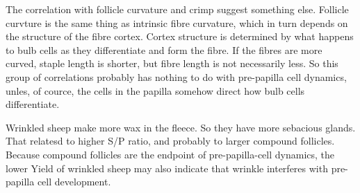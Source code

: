 \documentclass[titlepage]{article}  %
\begin{document}
The correlation with follicle curvature and crimp suggest something else. Follicle curvture is the same thing as intrinsic fibre curvature, which in turn depends on the structure of the fibre cortex. Cortex structure is determined by what happens to bulb cells as they differentiate and form the fibre. If the fibres are more curved, staple length is shorter, but fibre length is not necessarily less. So this group of correlations probably has nothing to do with pre-papilla cell dynamics, unles, of cource, the cells in the papilla somehow direct how bulb cells differentiate.

Wrinkled sheep make more wax in the fleece. So they have more sebacious glands. That relatesd to higher S/P ratio, and probably to larger compound follicles. Because compound follicles are the endpoint of pre-papilla-cell dynamics, the  lower Yield of wrinkled sheep may also indicate that wrinkle interferes with pre-papilla cell development.
\end{document}
